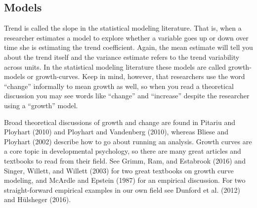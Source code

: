 \documentclass[english,,man]{apa6}
\theoremstyle{definition}
\theoremstyle{definition}
\theoremstyle{definition}
\theoremstyle{remark}
\begin{document}
\hypertarget{models}{%
\subsection{Models}\label{models}}

Trend is called the slope in the statistical modeling literature. That
is, when a researcher estimates a model to explore whether a variable
goes up or down over time she is estimating the trend coefficient.
Again, the mean estimate will tell you about the trend itself and the
variance estimate refers to the trend variability across units. In the
statistical modeling literature these models are called growth-models or
growth-curves. Keep in mind, however, that researchers use the word
\enquote{change} informally to mean growth as well, so when you read a
theoretical discussion you may see words like \enquote{change} and
\enquote{increase} despite the researcher using a \enquote{growth}
model.

Broad theoretical discussions of growth and change are found in Pitariu
and Ployhart (2010) and Ployhart and Vandenberg (2010), whereas Bliese
and Ployhart (2002) describe how to go about running an analysis. Growth
curves are a core topic in developmental psychology, so there are many
great articles and textbooks to read from their field. See Grimm, Ram,
and Estabrook (2016) and Singer, Willett, and Willett (2003) for two
great textbooks on growth curve modeling, and McArdle and Epstein (1987)
for an empirical discussion. For two straight-forward empirical examples
in our own field see Dunford et al. (2012) and Hülsheger (2016).
\end{document}
